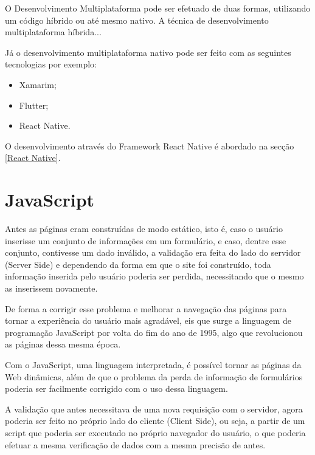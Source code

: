 O Desenvolvimento Multiplataforma pode ser efetuado de duas formas, utilizando um código híbrido ou até mesmo nativo.
A técnica de desenvolvimento multiplataforma híbrida...

Já o desenvolvimento multiplataforma nativo pode ser feito com as seguintes tecnologias por exemplo:

\begin{itemize}

\item Xamarim;
\item Flutter;
\item React Native.

\end{itemize}

O desenvolvimento através do Framework React Native é abordado na secção \ref{React Native}.

\section{JavaScript}\label{JavaScript}

Antes as páginas eram construídas de modo estático, isto é, caso o usuário inserisse um conjunto de informações em um formulário, e caso, dentre esse conjunto, contivesse um dado inválido, a validação era feita do lado do servidor (Server Side) e dependendo da forma em que o site foi construído, toda informação inserida pelo usuário poderia ser perdida, necessitando que o mesmo as inserissem novamente.

De forma a corrigir esse problema e melhorar a navegação das páginas para tornar a experiência do usuário mais agradável, eis que surge a linguagem de programação JavaScript por volta do fim do ano de 1995, algo que revolucionou as páginas dessa mesma época.

Com o JavaScript, uma linguagem interpretada, é possível tornar as páginas da Web dinâmicas, além de que o problema da perda de informação de formulários poderia ser facilmente corrigido com o uso dessa linguagem.

A validação que antes necessitava de uma nova requisição com o servidor, agora poderia ser feito no próprio lado do cliente (Client Side), ou seja, a partir de um script que poderia ser executado no próprio navegador do usuário, o que poderia efetuar a mesma verificação de dados com a mesma precisão de antes.


